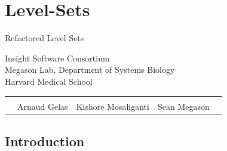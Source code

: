 \section{Level-Sets}
{
\color{white}
\begin{frame}[plain]
\fontsize{36pt}{36pt}\selectfont
\center
\begin{center}
Refactored Level Sets
\vskip12pt
\end{center}

\fontsize{12pt}{12pt}\selectfont
Insight Software Consortium\\
Megason Lab, Department of Systems Biology\\
Harvard Medical School
\vskip12pt
\begin{tabular}{cp{}p{}p{}c}
\\
\\
&
\centering{}Arnaud Gelas &
\centering{}Kishore Mosaliganti &
\centering{}Sean Megason & \\
\end{tabular}
\end{frame}
}

\subsection{Introduction}


